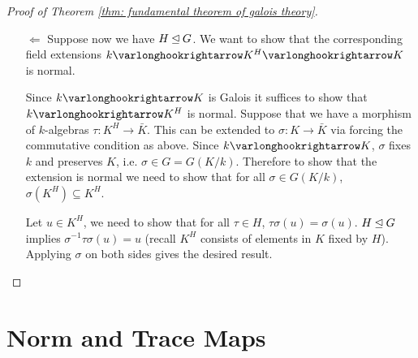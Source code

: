 \documentclass{article}
\begin{document}
\begin{proof}[Proof of Theorem \ref{thm: fundamental theorem of galois theory}]
\begin{enumerate}[label=\arabic*)]
\begin{itemize}
            \vspace{1em}
            \begin{minipage}{\linewidth}
                \centering
            \end{minipage}
            \vspace{1em}

            Since the extension $k \ext K$ is also normal, and we have the natural extension $K \ext \bar{L}$ (by Theorem \ref{thm: algebraic extension can be extended to algebraical closure}), apply again \hyperref[def: normal extension]{3) of normal extensions} $\bar{\tau}(K) \subseteq K$, which gives a pre-image for any automorphism in $G(L/k)$. Apply the first isomorphism theorem gives $G/H \simeq G(L/k)$.
            \item[$\Leftarrow$] Suppose now we have $H \unlhd G$. We want to show that the corresponding field extensions $k \ext K^H \ext K$ is normal.
            
            Since $k \ext K$ is Galois it suffices to show that $k \ext K^H$ is normal. Suppose that we have a morphism of $k$-algebras $\tau: K^H \to \bar{K}$. This can be extended to $\sigma: K \to \bar{K}$ via forcing the commutative condition as above. Since $k \ext K$, $\sigma$ fixes $k$ and preserves $K$, i.e. $\sigma \in G = G(K/k)$. Therefore to show that the extension is normal we need to show that for all $\sigma \in G(K/k)$, $\sigma(K^H) \subseteq K^H$. 

            Let $u \in K^H$, we need to show that for all $\tau \in H$, $\tau \sigma(u) = \sigma(u)$. $H \unlhd G$ implies $\sigma^{-1} \tau \sigma(u) = u$ (recall $K^H$ consists of elements in $K$ fixed by $H$). Applying $\sigma$ on both sides gives the desired result. 
        \end{itemize}
    \end{enumerate}
\end{proof}

\section{Norm and Trace Maps}
\end{document}
